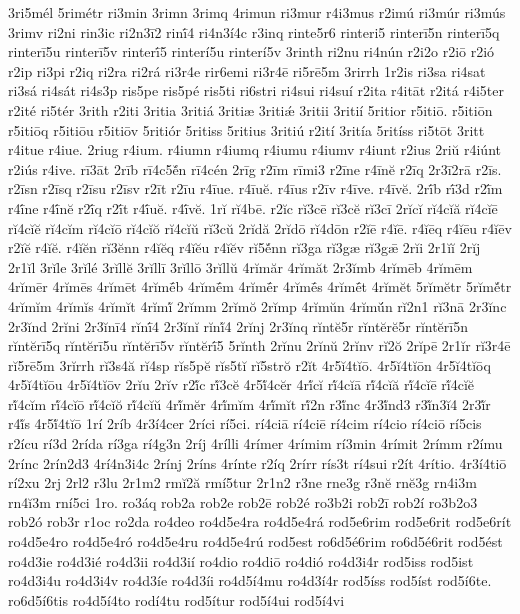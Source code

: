 {3ri5mél
5rimétr
ri3min
3rimn
3rimq
4rimun
ri3mur
r4i3mus
r2imú
ri3múr
ri3mús
3rimv
ri2ni
rin3ic
ri2n3ī2
rinī́4
ri4n3í4c
r3inq
rinte5r6
rinteri5
rinterī5n
rinterī5q
rinterī5u
rinterī5v
rinterī́5
rinterí5u
rinterí5v
3rinth
ri2nu
ri4nún
r2i2o
r2iō
r2ió
r2ip
ri3pi
r2iq
ri2ra
ri2rá
ri3r4e
rir6emi
ri3r4ē
ri5rē5m
3rirrh
1r2is
ri3sa
ri4sat
ri3sá
ri4sát
ri4s3p
ris5pe
ris5pé
ris5ti
ri6stri
ri4sui
ri4suí
r2ita
r4itāt
r2itá
r4i5ter
r2ité
ri5tér
3rith
r2iti
3ritia
3ritiá
3ritiæ
3ritiǽ
3ritii
3ritií
5ritior
r5itiō.
r5itiōn
r5itiōq
r5itiōu
r5itiōv
5ritiór
5ritiss
5ritius
3ritiú
r2ití
3ritía
5ritíss
ri5tōt
3ritt
r4itue
r4iue.
2riug
r4ium.
r4iumn
r4iumq
r4iumu
r4iumv
r4iunt
r2ius
2riŭ
r4iúnt
r2iús
r4ive.
rī3āt
2rīb
rī4c5ĕ́n
rī4cén
2rīg
r2īm
rīmi3
r2īne
r4īnĕ
r2īq
2r3ī2rā
r2īs.
r2īsn
r2īsq
r2īsu
r2īsv
r2īt
r2īu
r4īue.
r4īuĕ.
r4īus
r2īv
r4īve.
r4īvĕ.
2rī́b
rī́3d
r2ī́m
r4ī́ne
r4ī́nĕ
r2ī́q
r2ī́t
r4ī́uĕ.
r4ī́vĕ.
1rĭ
rĭ4bē.
r2ĭc
rĭ3cē
rĭ3cĕ
rĭ3cī
2rĭcĭ
rĭ4cĭă
rĭ4cĭē
rĭ4cĭĕ
rĭ4cĭm
rĭ4cĭō
rĭ4cĭŏ
rĭ4cĭŭ
rĭ3cŭ
2rĭdă
2rĭdō
rĭ4dōn
r2ĭē
r4ĭē.
r4ĭēq
r4ĭēu
r4ĭēv
r2ĭĕ
r4ĭĕ.
r4ĭĕn
rĭ3ĕnn
r4ĭĕq
r4ĭĕu
r4ĭĕv
rĭ5ĕ́nn
rĭ3ga
rĭ3gæ
rĭ3gǣ
2rĭi
2r1ĭĭ
2rĭj
2r1ĭl
3rĭle
3rĭlé
3rĭllĕ
3rĭllī
3rĭllō
3rĭllŭ
4rĭmăr
4rĭmăt
2r3ĭmb
4rĭmēb
4rĭmēm
4rĭmēr
4rĭmēs
4rĭmēt
4rĭmḗb
4rĭmḗm
4rĭmḗr
4rĭmḗs
4rĭmḗt
4rĭmĕt
5rĭmĕtr
5rĭmĕ́tr
4rĭmĭm
4rĭmĭs
4rĭmĭt
4rĭmĭ́
2rĭmm
2rĭmŏ
2rĭmp
4rĭmŭn
4rĭmŭ́n
rĭ2n1
rĭ3nā
2r3ĭnc
2r3ĭnd
2rĭni
2r3ĭnī4
rĭnī́4
2r3ĭnĭ
rĭnĭ́4
2rĭnj
2r3ĭnq
rĭntĕ5r
rĭntĕrĕ5r
rĭntĕrī5n
rĭntĕrī5q
rĭntĕrī5u
rĭntĕrī5v
rĭntĕrī́5
5rĭnth
2rĭnu
2rĭnŭ
2rĭnv
rĭ2ŏ
2rĭpē
2r1ĭr
rĭ3r4ē
rĭ5rē5m
3rĭrrh
rĭ3s4ă
rĭ4sp
rĭs5pĕ
rĭs5tĭ
rĭ5strŏ
r2ĭt
4r5ĭ4tĭō.
4r5ĭ4tĭōn
4r5ĭ4tĭōq
4r5ĭ4tĭōu
4r5ĭ4tĭōv
2rĭu
2rĭv
r2ĭ́c
rĭ́3cĕ
4r5ĭ́4cĕr
4rĭ́cĭ
rĭ́4cĭā
rĭ́4cĭă
rĭ́4cĭē
rĭ́4cĭĕ
rĭ́4cĭm
rĭ́4cĭō
rĭ́4cĭŏ
rĭ́4cĭŭ
4rĭ́mĕr
4rĭ́mĭm
4rĭ́mĭt
rĭ́2n
r3ĭ́nc
4r3ĭ́nd3
r3ĭ́n3ĭ4
2r3ĭ́r
r4ĭ́s
4r5ĭ́4tĭō
1rí
2ríb
4r3í4cer
2ríci
rí5ci.
rí4ciā
rí4ciē
rí4cim
rí4cio
rí4ciō
rí5cis
r2ícu
rí3d
2rída
rí3ga
rí4g3n
2ríj
4rílli
4rímer
4rímim
rí3min
4rímit
2rímm
r2ímu
2rínc
2rín2d3
4rí4n3i4c
2rínj
2ríns
4rínte
r2íq
2rírr
rís3t
rí4sui
r2ít
4rítio.
4r3í4tiō
rí2xu
2rj
2rl2
r3lu
2r1m2
rmĭ2ă
rmí5tur
2r1n2
r3ne
rne3g
r3nĕ
rnĕ3g
rn4i3m
rn4ĭ3m
rní5ci
1ro.
ro3áq
rob2a
rob2e
rob2ē
rob2é
ro3b2i
rob2ī
rob2í
ro3b2o3
rob2ó
rob3r
r1oc
ro2da
ro4deo
ro4d5e4ra
ro4d5e4rá
rod5e6rim
rod5e6rit
rod5e6rít
ro4d5e4ro
ro4d5e4ró
ro4d5e4ru
ro4d5e4rú
rod5est
ro6d5é6rim
ro6d5é6rit
rod5ést
ro4d3ie
ro4d3ié
ro4d3ii
ro4d3ií
ro4dio
ro4diō
ro4dió
ro4d3i4r
rod5iss
rod5ist
ro4d3i4u
ro4d3i4v
ro4d3íe
ro4d3íi
ro4d5í4mu
ro4d3í4r
rod5íss
rod5íst
rod5í6te.
ro6d5í6tis
ro4d5í4to
rodí4tu
rod5ítur
rod5í4ui
rod5í4vi
}
